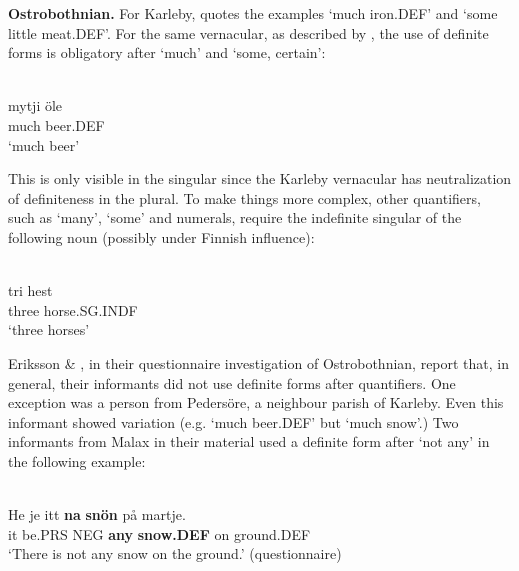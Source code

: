 \textbf{Ostrobothnian.} For Karleby, \citet[94]{Hagfors1891} quotes the examples  ‘much iron.DEF’ and  ‘some little meat.DEF’. For the same vernacular, as described by \citet{Vangsnes2003}, the use of definite forms is obligatory after  ‘much’ and  ‘some, certain’:


\ea \label{} 
\\
\gll mytji  öle\\
much  beer.DEF\\
\glt ‘much beer’

\z

This is only visible in the singular since the Karleby vernacular has neutralization of definiteness in the plural. To make things more complex, other quantifiers, such as  ‘many’,  ‘some’ and numerals, require the indefinite singular of the following noun (possibly under Finnish influence):


\ea \label{} 
\\
\gll tri  hest\\
three  horse.SG.INDF\\
\glt ‘three horses’

\z

Eriksson \& \citet[26]{Rendahl1999}, in their questionnaire investigation of Ostrobothnian, report that, in general, their informants did not use definite forms after quantifiers. One exception was a person from Pedersöre, a neighbour parish of Karleby. Even this informant showed variation (e.g.  ‘much beer.DEF’ but  ‘much snow’.) Two informants from Malax in their material used a definite form after  ‘not any’ in the following example:


\ea \label{} 
\\
\gll He  je  itt  \textbf{na} \textbf{snön} på  martje.\\
it  be.PRS  NEG  \textbf{any} \textbf{snow.DEF} on  ground.DEF\\
\glt ‘There is not any snow on the ground.’ (questionnaire)

